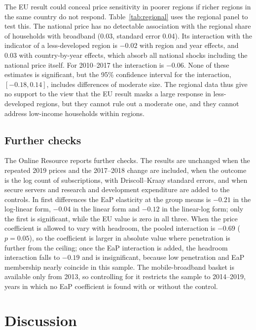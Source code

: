 \documentclass[pdflatex,sn-basic]{sn-jnl}
\begin{document}
The EU result could conceal price sensitivity in poorer regions if richer regions in the same country do not respond. Table~\ref{tab:regional} uses the regional panel to test this. The national price has no detectable association with the regional share of households with broadband ($0.03$, standard error 0.04). Its interaction with the indicator of a less-developed region is $-0.02$ with region and year effects, and $0.03$ with country-by-year effects, which absorb all national shocks including the national price itself. For 2010--2017 the interaction is $-0.06$. None of these estimates is significant, but the 95\% confidence interval for the interaction, $[-0.18, 0.14]$, includes differences of moderate size. The regional data thus give no support to the view that the EU result masks a large response in less-developed regions, but they cannot rule out a moderate one, and they cannot address low-income households within regions.



\subsection{Further checks}\label{sec:further}

The Online Resource reports further checks. The results are unchanged when the repeated 2019 prices and the 2017--2018 change are included, when the outcome is the log count of subscriptions, with Driscoll--Kraay standard errors, and when secure servers and research and development expenditure are added to the controls. In first differences the EaP elasticity at the group means is $-0.21$ in the log-linear form, $-0.04$ in the linear form and $-0.12$ in the linear-log form; only the first is significant, while the EU value is zero in all three. When the price coefficient is allowed to vary with headroom, the pooled interaction is $-0.69$ ($p=0.05$), so the coefficient is larger in absolute value where penetration is further from the ceiling; once the EaP interaction is added, the headroom interaction falls to $-0.19$ and is insignificant, because low penetration and EaP membership nearly coincide in this sample. The mobile-broadband basket is available only from 2013, so controlling for it restricts the sample to 2014--2019, years in which no EaP coefficient is found with or without the control.

\section{Discussion}\label{sec:discussion}
\end{document}
